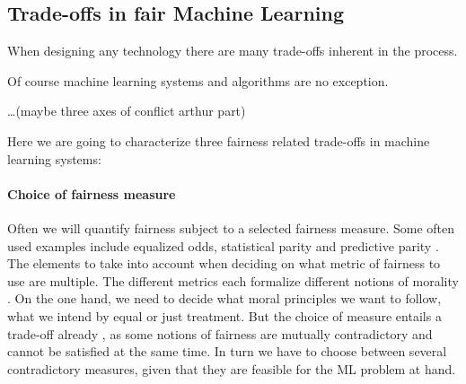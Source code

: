 
	\subsection{Trade-offs in fair Machine Learning}
	When designing any technology \cite{alexander1964notes} there are many trade-offs inherent in the process.
	
	Of course machine learning systems and algorithms are no exception.

	\dots (maybe three axes of conflict arthur part)

	Here we are going to characterize three fairness related trade-offs in machine learning systems:
	
	
	\paragraph{Choice of fairness measure}
	Often we will quantify fairness subject to a selected fairness measure.
	Some often used examples include equalized odds, statistical parity and predictive parity \cite{garg2020fairness}.
    The elements to take into account when deciding on what metric of fairness to use are multiple.
	The different metrics each formalize different notions of morality \cite{binns2020apparent}.
    On the one hand, we need to decide what moral principles we want to follow, \ie what we intend by equal or just treatment.
	But the choice of measure entails a trade-off already \cite{chouldechova2017fair} \cite{kleinberg2016inherent} \cite{berk2021fairness}, as some notions of fairness are mutually contradictory and cannot be satisfied at the same time.
	In turn we have to choose between several contradictory measures, given that they are feasible for the ML problem at hand.


